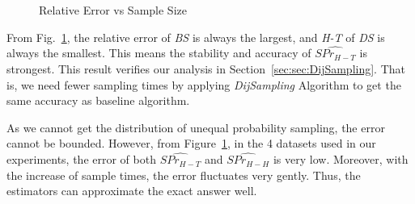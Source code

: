 \documentclass[runningheads,a4paper]{llncs}
\begin{document}
\begin{figure}[htbp]
\vspace{-0.7cm}
  \centering
\vspace{-0.3cm}
  \caption{Relative Error vs Sample Size}
  \label{fig:error}
\vspace{-0.6cm}
\end{figure}

From Fig.~\ref{fig:error}, the relative error of \emph{BS} is always the largest, and \emph{H-T} of \emph{DS} is always the smallest. This means the stability and accuracy of $\widehat{SPr_{H-T}}$ is strongest. This result verifies our analysis in Section~\ref{sec:sec:DijSampling}. That is, we need fewer sampling times by applying \emph{DijSampling} Algorithm to get the same accuracy as baseline algorithm.

As we cannot get the distribution of unequal probability sampling, the error cannot be bounded. However, from Figure~\ref{fig:error}, in the 4 datasets used in our experiments, the error of both $\widehat{SPr_{H-T}}$ and $\widehat{SPr_{H-H}}$ is very low. Moreover, with the increase of sample times, the error fluctuates very gently. Thus, the estimators can approximate the exact answer well.
\end{document}
